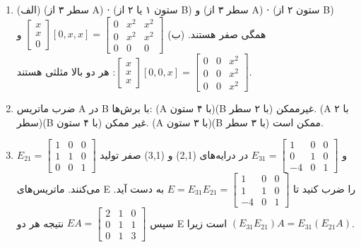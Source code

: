 \documentclass[12pt,a4paper]{article}
\begin{document}
{\begin{enumerate}
			\item (الف) (سطر ۳ از A) ⋅ (ستون ۱ یا ۲ از B) و (سطر ۳ از A) ⋅ (ستون ۲ از B) همگی صفر هستند.
			(ب) $\begin{bmatrix} x \\ x \\ 0 \end{bmatrix} [0,x,x] = \begin{bmatrix} 0 & x^2 & x^2 \\ 0 & x^2 & x^2 \\ 0 & 0 & 0 \end{bmatrix}$ و $\begin{bmatrix} x \\ x \\ x \end{bmatrix} [0,0,x] = \begin{bmatrix} 0 & 0 & x^2 \\ 0 & 0 & x^2 \\ 0 & 0 & x^2 \end{bmatrix}$: هر دو بالا مثلثی هستند.
			
			\item ضرب ماتریس A در B با برش‌ها:
			(A با ۴ ستون)(B با ۲ سطر) غیرممکن. (A با ۲ سطر)(B با ۴ ستون) غیر ممکن. (A با ۳ ستون)(B با ۳ سطر) ممکن است.
			
			\item $E_{21} = \begin{bmatrix} 1 & 0 & 0 \\ 1 & 1 & 0 \\ 0 & 0 & 1 \end{bmatrix}$ و $E_{31} = \begin{bmatrix} 1 & 0 & 0 \\ 0 & 1 & 0 \\ -4 & 0 & 1 \end{bmatrix}$ در درایه‌های (2,1) و (3,1) صفر تولید می‌کنند.
			ماتریس‌های E را ضرب کنید تا $E = E_{31}E_{21} = \begin{bmatrix} 1 & 0 & 0 \\ 1 & 1 & 0 \\ -4 & 0 & 1 \end{bmatrix}$ به دست آید. سپس $EA = \begin{bmatrix} 2 & 1 & 0 \\ 0 & 1 & 1 \\ 0 & 1 & 3 \end{bmatrix}$ نتیجه هر دو E است زیرا $(E_{31}E_{21})A = E_{31}(E_{21}A)$.
			

\end{enumerate}}
\end{document}
